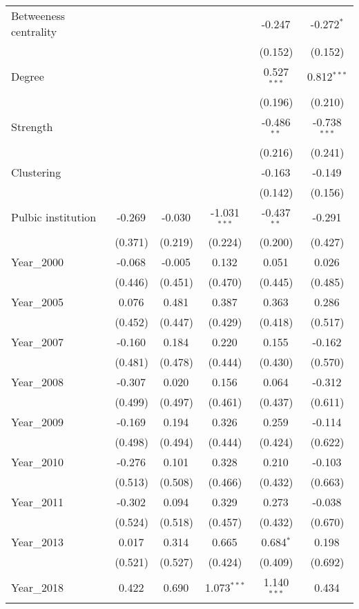 \begin{table}[!htbp]
\begin{tabular}{@{\extracolsep{5pt}}lccccc}
 Betweeness centrality & & & & -0.247$^{}$ & -0.272$^{*}$ \\
& & & & (0.152) & (0.152) \\
 Degree & & & & 0.527$^{***}$ & 0.812$^{***}$ \\
& & & & (0.196) & (0.210) \\
 Strength & & & & -0.486$^{**}$ & -0.738$^{***}$ \\
& & & & (0.216) & (0.241) \\
 Clustering & & & & -0.163$^{}$ & -0.149$^{}$ \\
& & & & (0.142) & (0.156) \\
 Pulbic institution & -0.269$^{}$ & -0.030$^{}$ & -1.031$^{***}$ & -0.437$^{**}$ & -0.291$^{}$ \\
& (0.371) & (0.219) & (0.224) & (0.200) & (0.427) \\
 Year_2000 & -0.068$^{}$ & -0.005$^{}$ & 0.132$^{}$ & 0.051$^{}$ & 0.026$^{}$ \\
& (0.446) & (0.451) & (0.470) & (0.445) & (0.485) \\
 Year_2005 & 0.076$^{}$ & 0.481$^{}$ & 0.387$^{}$ & 0.363$^{}$ & 0.286$^{}$ \\
& (0.452) & (0.447) & (0.429) & (0.418) & (0.517) \\
 Year_2007 & -0.160$^{}$ & 0.184$^{}$ & 0.220$^{}$ & 0.155$^{}$ & -0.162$^{}$ \\
& (0.481) & (0.478) & (0.444) & (0.430) & (0.570) \\
 Year_2008 & -0.307$^{}$ & 0.020$^{}$ & 0.156$^{}$ & 0.064$^{}$ & -0.312$^{}$ \\
& (0.499) & (0.497) & (0.461) & (0.437) & (0.611) \\
 Year_2009 & -0.169$^{}$ & 0.194$^{}$ & 0.326$^{}$ & 0.259$^{}$ & -0.114$^{}$ \\
& (0.498) & (0.494) & (0.444) & (0.424) & (0.622) \\
 Year_2010 & -0.276$^{}$ & 0.101$^{}$ & 0.328$^{}$ & 0.210$^{}$ & -0.103$^{}$ \\
& (0.513) & (0.508) & (0.466) & (0.432) & (0.663) \\
 Year_2011 & -0.302$^{}$ & 0.094$^{}$ & 0.329$^{}$ & 0.273$^{}$ & -0.038$^{}$ \\
& (0.524) & (0.518) & (0.457) & (0.432) & (0.670) \\
 Year_2013 & 0.017$^{}$ & 0.314$^{}$ & 0.665$^{}$ & 0.684$^{*}$ & 0.198$^{}$ \\
& (0.521) & (0.527) & (0.424) & (0.409) & (0.692) \\
 Year_2018 & 0.422$^{}$ & 0.690$^{}$ & 1.073$^{***}$ & 1.140$^{***}$ & 0.434$^{}$ \\

\end{tabular}
\end{table}
